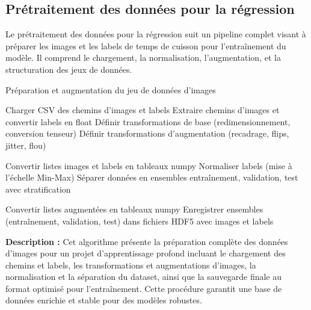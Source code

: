 \subsection{Prétraitement des données pour la régression}

Le prétraitement des données pour la régression suit un pipeline complet visant à préparer les images et les labels de temps de cuisson pour l’entraînement du modèle. Il comprend le chargement, la normalisation, l’augmentation, et la structuration des jeux de données.



\begin{algorithm}[H]
\caption{Préparation et augmentation du jeu de données d’images}

Charger CSV des chemins d’images et labels\;
Extraire chemins d’images et convertir labels en float\;
Définir transformations de base (redimensionnement, conversion tenseur)\;
Définir transformations d’augmentation (recadrage, flips, jitter, flou)\;


Convertir listes images et labels en tableaux numpy\;
Normaliser labels (mise à l’échelle Min-Max)\;
Séparer données en ensembles entraînement, validation, test avec stratification\;


Convertir listes augmentées en tableaux numpy\;
Enregistrer ensembles (entraînement, validation, test) dans fichiers HDF5 avec images et labels\;

\end{algorithm}

\vspace{5mm}

\noindent\textbf{Description :} Cet algorithme présente la préparation complète des données d’images pour un projet d’apprentissage profond incluant le chargement des chemins et labels, les transformations et augmentations d’images, la normalisation et la séparation du dataset, ainsi que la sauvegarde finale au format optimisé pour l’entraînement. Cette procédure garantit une base de données enrichie et stable pour des modèles robustes.

